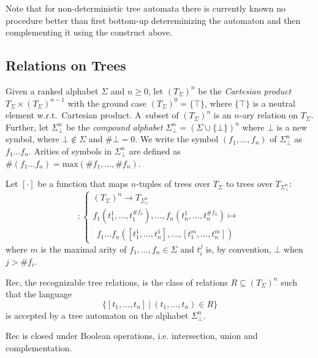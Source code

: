 Note that for non-deterministic tree automata there is currently known no
procedure better than first bottom-up detereminizing the automaton and then
complementing it using the construct above.

 \subsection{Relations on Trees}

Given a ranked alphabet $\Sigma$ and $n \geq 0$, let $(T_\Sigma)^n$ be the
\emph{Cartesian product} $T_\Sigma \times (T_\Sigma)^{n-1}$ with the ground case
$(T_\Sigma)^0 = \{\top\}$, where $\{\top\}$ is a neutral element w.r.t.\ 
Cartesian product. A~subset of $(T_\Sigma)^n$ is an $n$-ary relation on
$T_\Sigma$. Further, let $\Sigma^n_\bot$ be the \emph{compound alphabet}
$\Sigma_\bot^n = (\Sigma \cup \{\bot\})^n$ where $\bot$ is a new symbol, where
$\bot \notin \Sigma$ and $\#\bot = 0$. We write the symbol
$(f_1,\ldots,f_n)$ of $\Sigma_\bot^n$ as $f_1\ldots f_n$. Arities of symbols in
$\Sigma_\bot^n$ are defined as $\#(f_1\ldots f_n) =
\text{max}(\#f_1,\ldots,\#f_n)$.

Let $[\cdot]$ be a function that maps $n$-tuples of trees over $T_\Sigma$ to
trees over $T_{\Sigma_\bot^n}$:
\begin{equation}
    [\cdot] :
    \begin{cases}
     (T_\Sigma)^n \rightarrow T_{\Sigma^n_\bot}\\
		 f_1(t_1^1,\ldots,t^{\#f_1}_1),\ldots,f_n(t_n^1,\ldots,t^{\#f_n}_n) \mapsto\\
		 \ \ f_1\ldots f_n([t_1^1,\ldots,t_n^1],\ldots,[t_1^m,\ldots,t_n^m])
   \end{cases}
\end{equation}
 where $m$ is the maximal arity of $f_1,\ldots,f_n \in \Sigma$ and $t_i^j$ is,
 by convention, $\bot$ when $j > \#f_i$.

\begin{defz}
Rec, the recognizable tree relations, is the class of relations $R \subseteq
(T_\Sigma)^n$ such that the language 
\begin{equation}
\{[t_1,\ldots,t_n]\ |\ (t_1,\ldots,t_n)
\in R\}
\end{equation} is accepted by a tree automaton on the alphabet $\Sigma_\bot^n$.
\end{defz}

\begin{prop}
Rec is closed under Boolean operations, i.e. intersection, union and
complementation.
\end{prop}

